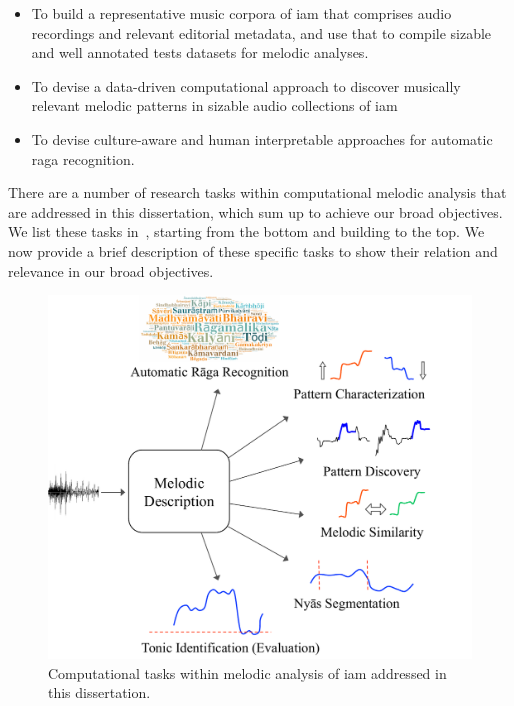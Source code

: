 \begin{itemize}
	\item To build a representative music corpora of \gls{iam} that comprises audio recordings and relevant editorial metadata, and use that to compile sizable and well annotated tests datasets for melodic analyses.
	\item To devise a data-driven computational approach to discover musically relevant melodic patterns in sizable audio collections of \gls{iam}
	\item To devise culture-aware and human interpretable approaches for automatic \gls{raga} recognition.
\end{itemize}


 There are a number of research tasks within computational melodic analysis that are addressed in this dissertation, which sum up to achieve our broad objectives. We list these tasks in~, starting from the bottom and building to the top. We now provide a brief description of these specific tasks to show their relation and relevance in our broad objectives. 

\begin{figure}[h]
	\begin{center}
		\includegraphics[width=\figSizeHundred]{ch01_introduction/figures/tasks.pdf}
	\end{center}
	\caption{Computational tasks within melodic analysis of \gls{iam} addressed in this dissertation.}
	\label{fig:tasks}
\end{figure}

